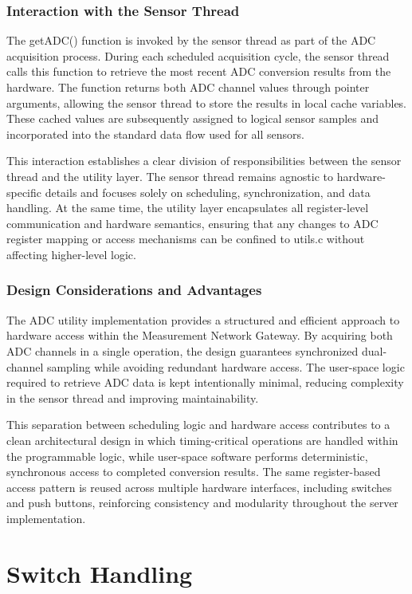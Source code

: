 \subsubsection{Interaction with the Sensor Thread}
The getADC() function is invoked by the sensor thread as part of the ADC acquisition process. During each scheduled acquisition cycle, the sensor thread calls this function to retrieve the most recent ADC conversion results from the hardware. The function returns both ADC channel values through pointer arguments, allowing the sensor thread to store the results in local cache variables. These cached values are subsequently assigned to logical sensor samples and incorporated into the standard data flow used for all sensors.

This interaction establishes a clear division of responsibilities between the sensor thread and the utility layer. The sensor thread remains agnostic to hardware-specific details and focuses solely on scheduling, synchronization, and data handling. At the same time, the utility layer encapsulates all register-level communication and hardware semantics, ensuring that any changes to ADC register mapping or access mechanisms can be confined to utils.c without affecting higher-level logic.

\subsubsection{Design Considerations and Advantages}
The ADC utility implementation provides a structured and efficient approach to hardware access within the Measurement Network Gateway. By acquiring both ADC channels in a single operation, the design guarantees synchronized dual-channel sampling while avoiding redundant hardware access. The user-space logic required to retrieve ADC data is kept intentionally minimal, reducing complexity in the sensor thread and improving maintainability.

This separation between scheduling logic and hardware access contributes to a clean architectural design in which timing-critical operations are handled within the programmable logic, while user-space software performs deterministic, synchronous access to completed conversion results. The same register-based access pattern is reused across multiple hardware interfaces, including switches and push buttons, reinforcing consistency and modularity throughout the server implementation.


\section{Switch Handling}
